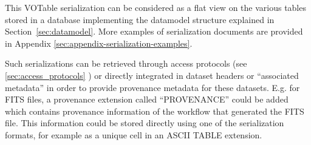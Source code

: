 This VOTable serialization can be considered as a flat view on the various tables stored in a database implementing the datamodel structure explained in Section~\ref{sec:datamodel}.
More examples of serialization documents are provided in Appendix \ref{sec:appendix-serialization-examples}.


Such serializations can be retrieved through access protocols (see \ref{sec:access_protocols} ) or directly integrated in dataset headers or ``associated metadata'' in order to provide provenance metadata for these datasets. E.g. for FITS files, a provenance extension called ``PROVENANCE'' could be added which contains provenance information of the workflow that generated the FITS file. This information could be stored directly using one of the serialization formats, for example as a unique cell in an ASCII TABLE extension.

